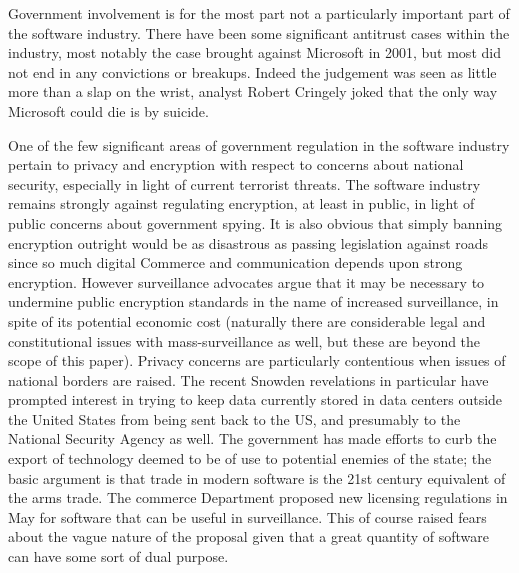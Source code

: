 Government involvement is for the most part not a particularly important part of the software industry.
There have been some significant antitrust cases within the industry, most notably the case brought against Microsoft in 2001, but most did not end in any convictions or breakups.
Indeed the judgement was seen as little more than a slap on the wrist, analyst Robert Cringely joked that the only way Microsoft could die is by suicide.\autocite{ImmortalMicrosoft}

One of the few significant areas of government regulation in the software industry pertain to privacy and encryption with respect to concerns about national security, especially in light of current terrorist threats.\autocite[]{TerroristData}
The software industry remains strongly against regulating encryption, at least in public, in light of public concerns about government spying.\autocite[]{TerroristData}
It is also obvious that simply banning encryption outright would be as disastrous as passing legislation against roads since so much digital Commerce and communication depends upon strong encryption.\autocite[]{TerroristData}
However surveillance advocates argue that it may be necessary to undermine public encryption standards in the name of increased surveillance, in spite of its potential economic cost (naturally there are considerable legal and constitutional issues with mass-surveillance as well, but these are beyond the scope of this paper).
Privacy concerns are particularly contentious when issues of national borders are raised. The recent Snowden revelations in particular have prompted interest in trying to keep data currently stored in data centers outside the United States from being sent back to the US, and presumably to the National Security Agency as well.\autocite[]{OffMyCloud}
The government has made efforts to curb the export of technology deemed to be of use to potential enemies of the state; the basic argument is that trade in modern software is the 21st century equivalent of the arms trade.\autocite[]{HeatsUpSurveillance}
The commerce Department proposed new licensing regulations in May for software that can be useful in surveillance. This of course raised fears about the vague nature of the proposal given that a great quantity of software can have some sort of dual purpose.\autocite[]{HeatsUpSurveillance}

